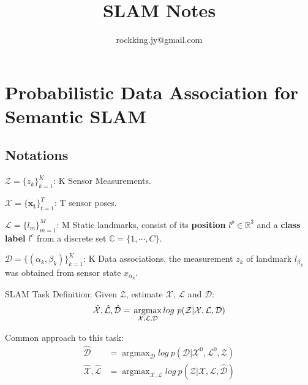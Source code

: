 \documentclass[12pt]{article}
\DeclareMathOperator*{\argmax}{argmax} %
\numberwithin{equation}{section}
\begin{document}
\small
\title{SLAM Notes}
\author{rockking.jy@gmail.com}
\pagestyle{fancy}\fancyhf{}
\lhead{}
\lfoot{\textit{}}\cfoot{}\rfoot{\thepage}
\renewcommand{\headrulewidth}{1.pt}
\renewcommand{\footrulewidth}{1.pt}
\maketitle
\tableofcontents
\section{Probabilistic Data Association for Semantic SLAM \cite{bowman2017probabilistic} \cite{atanasov2018unifying}}
\subsection{Notations}
$\mathcal{Z}=\{z_k\}^K_{k=1}$: K Sensor Measurements. \par
$\mathcal{X}=\{\bm{x_t}\}^T_{t=1}$: T sensor poses. \par
$\mathcal{L}=\{l_m\}^M_{m=1}$: M Static landmarks, consist of its \textbf{position} $l^p \in \mathbb{R}^3$ and a \textbf{class label} $l^c$ from a discrete set $\mathbb{C}=\{1, \cdots , C\}$. \par
$\mathcal{D}=\{(\alpha_k, \beta_k)\}^K_{k=1}$: K Data associations, the measurement $z_k$ of landmark $l_{\beta_k}$ was obtained from sensor state $x_{\alpha_k}$. \par
SLAM Task Definition: Given $\mathcal{Z}$, estimate $\mathcal{X}$, $\mathcal{L}$ and $\mathcal{D}$:
\begin{equation}
	\hat{\mathcal{X}}, \hat{\mathcal{L}}, \hat{\mathcal{D}} = \\
		\argmax_{\mathcal{X},\mathcal{L},\mathcal{D}} log\ p(\mathcal{Z}|\mathcal{X},\mathcal{L},\mathcal{D})
\end{equation} \par
Common approach to this task:
\begin{subequations}
\begin{align}
	\hat{\mathcal{D}} &= 
		\argmax_{\mathcal{D}} log\ p(\mathcal{D}|\mathcal{X}^0,\mathcal{L}^0,\mathcal{Z}) \\
	\hat{\mathcal{X}}, \hat{\mathcal{L}} &= 
		\argmax_{\mathcal{X},\mathcal{L}} log\ p(\mathcal{Z}|\mathcal{X},\mathcal{L},\hat{\mathcal{D}})
\end{align}
\end{subequations} \par
\end{document}
